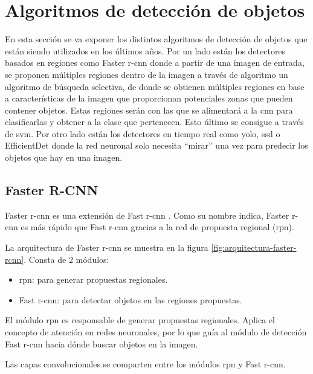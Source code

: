 \section{Algoritmos de detección de objetos}
\label{sec:tecnicas-utilizadas-detection}

En esta sección se va exponer los distintos algoritmos de detección de objetos que están siendo utilizados en los últimos años. Por un lado están los detectores basados en regiones como Faster \gls{r-cnn} donde a partir de una imagen de entrada, se proponen múltiples regiones dentro de la imagen a través de algoritmo un algoritmo de búsqueda selectiva, de donde se obtienen múltiples regiones en base a características de la imagen que proporcionan potenciales zonas que pueden contener objetos. Estas regiones serán con las que se alimentará a la \gls{cnn} para clasificarlas y obtener a la clase que pertenecen. Esto último se consigue a través de \gls{svm}. Por otro lado están los detectores en tiempo real como \gls{yolo}, \gls{ssd} o EfficientDet donde la red neuronal solo necesita ``mirar'' una vez para predecir los objetos que hay en una imagen.

\subsection{Faster R-CNN}
\label{subsec:faster-rcnn}

Faster \gls{r-cnn} \cite{ren2016faster} es una extensión de Fast \gls{r-cnn} \cite{7410526}. Como su nombre indica, Faster \gls{r-cnn} es más rápido que Fast \gls{r-cnn} gracias a la red de propuesta regional (\gls{rpn}).

La arquitectura de Faster \gls{r-cnn} se muestra en la figura \ref{fig:arquitectura-faster-rcnn}. Consta de 2 módulos:

\begin{itemize}
    \item \gls{rpn}: para generar propuestas regionales.
    \item Fast \gls{r-cnn}: para detectar objetos en las regiones propuestas.
\end{itemize}

El módulo \gls{rpn} es responsable de generar propuestas regionales. Aplica el concepto de atención en redes neuronales, por lo que guía al módulo de detección Fast \gls{r-cnn} hacia dónde buscar objetos en la imagen.

Las capas convolucionales se comparten entre los módulos \gls{rpn} y Fast \gls{r-cnn}.

